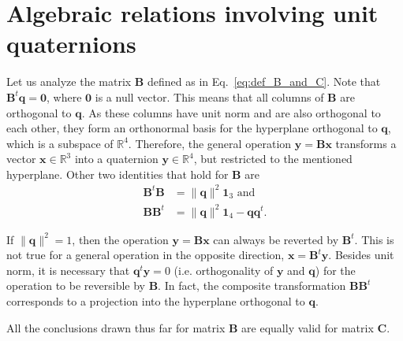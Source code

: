 \documentclass[aip,jcp,reprint,amsmath,amssymb,amsfont]{revtex4-1}
\newcommand{\mt}[1]{\boldsymbol{\mathbf{#1}}}           %
\newcommand{\vt}[1]{\boldsymbol{\mathbf{#1}}}           %
\newcommand{\tr}[1]{#1^t}                               %
\begin{document}
\section{\label{sec:auxiliary_math}Algebraic relations involving unit quaternions}

Let us analyze the matrix $\mt B$ defined as in Eq.~\ref{eq:def_B_and_C}. Note that $\tr{\mt B}\vt q = \vt 0$, where $\vt 0$ is a null vector.\cite{Haug1989, Shuster1993, Dichmann1999} This means that all columns of $\mt B$ are orthogonal to $\vt q$. As these columns have unit norm and are also orthogonal to each other, they form an orthonormal basis for the hyperplane orthogonal to $\mt q$, which is a subspace of $\mathbb{R}^4$. Therefore, the general operation $\vt y = \mt B \vt x$ transforms a vector $\vt x \in \mathbb{R}^3$ into a quaternion $\vt y \in \mathbb{R}^4$, but restricted to the mentioned hyperplane. Other two identities that hold for $\mt B$ are\citep{Haug1989}
\begin{align*}
\tr{\mt B}\mt B &= \lVert \vt q \lVert ^2{\mt 1}_3 \text{ and} \\
\mt B\tr{\mt B} &= \lVert \vt q \lVert ^2{\mt 1}_4 - {\vt q}\tr{\vt q}.
\end{align*}

If $\lVert \vt q \lVert^2 = 1$, then the operation $\vt y = \mt B \vt x$ can always be reverted by $\tr{\mt B}$. This is not true for a general operation in the opposite direction, $\vt x = \tr{\mt B} \vt y$. Besides unit norm, it is necessary that $\tr{\vt q}\vt y = 0$ (i.e. orthogonality of $\vt y$ and $\vt q$) for the operation to be reversible by $\mt B$. In fact, the composite transformation $\mt B\tr{\mt B}$ corresponds to a projection into the hyperplane orthogonal to $\vt q$.\cite{Dichmann1999}

All the conclusions drawn thus far for matrix $\mt B$ are equally valid for matrix $\mt C$.
\end{document}
